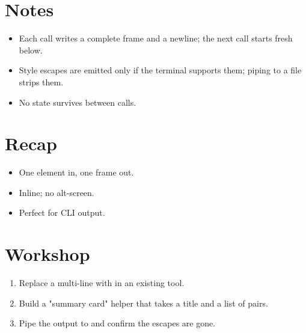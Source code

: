 \section{Notes}

\begin{itemize}[leftmargin=*]
  \item Each call writes a complete frame and a newline; the
    next call starts fresh below.
  \item Style escapes are emitted only if the terminal
    supports them; piping to a file strips them.
  \item No state survives between calls.
\end{itemize}

\section{Recap}

\begin{recap}
\begin{itemize}[leftmargin=*]
  \item One element in, one frame out.
  \item Inline; no alt-screen.
  \item Perfect for CLI output.
\end{itemize}
\end{recap}

\section*{Workshop}

\begin{enumerate}[leftmargin=*]
  \item Replace a multi-line  with 
    in an existing tool.
  \item Build a "summary card" helper that takes a title and
    a list of pairs.
  \item Pipe the output to  and confirm the
    escapes are gone.
\end{enumerate}
